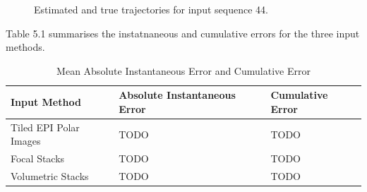 \begin{figure}[H]
    \caption{Estimated and true trajectories for input sequence 44.}
    \setcounter{subfigure}{0}
\end{figure}

Table 5.1 summarises the instatnaneous and cumulative errors for the three input methods. 
 
\begin{table}[htbp]
    \caption{Mean Absolute Instantaneous Error and Cumulative Error}
    \centering
    \begin{tabular}{@{}lll@{}}
        \toprule
        Input Method        & Absolute Instantaneous Error   & Cumulative Error  \\
        \midrule 
        Tiled EPI Polar Images & TODO & TODO \\
        Focal Stacks & TODO & TODO \\
        Volumetric Stacks & TODO & TODO \\
        \bottomrule
        
    \end{tabular}
\end{table}


